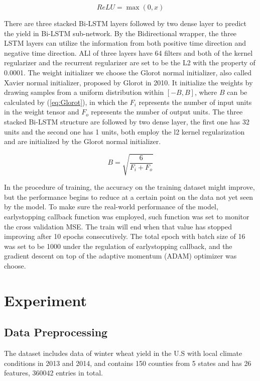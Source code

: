 \documentclass[conference, a4paper]{IEEEtran}
\begin{document}
      \begin{equation}
        ReLU=\max(0, x)
        \label{eq:relu}
      \end{equation}
      
      There are three stacked Bi-LSTM layers followed by two dense layer to predict the yield in Bi-LSTM sub-network. By the Bidirectional wrapper, the three LSTM layers can utilize the information from both positive time direction and negative time direction. ALl of three layers have 64 filters and both of the kernel regularizer and the recurrent regularizer are set to be the L2 with the property of 0.0001. The weight initializer we choose the Glorot normal initializer, also called Xavier normal initializer, proposed by Glorot in 2010\cite{glorotUnderstandingDifficultyTraining2010}. It initialize the weights by drawing samples from a uniform distribution within $[-B, B]$, where $B$ can be calculated by (\ref{eq:Glorot}), in which the $F_{i}$ represents the number of input units in the weight tensor and $F_o$ represents the number of output units. The three stacked Bi-LSTM structure are followed by two dense layer, the first one has 32 units and the second one has 1 units, both employ the l2 kernel regularization and are initialized by the Glorot normal initializer.
      
      \begin{equation}
        B = \sqrt{\frac{6}{F_{i} + F_{o}}}
        \label{eq:Glorot}
      \end{equation}

      In the procedure of training, the accuracy on the training dataset might improve, but the performance begins to reduce at a certain point on the data not yet seen by the model. To make sure the real-world performance of the model, earlystopping callback function was employed, such function was set to monitor the cross validation MSE. The train will end when that value has stopped improving after 10 epochs consecutively. The total epoch with batch size of 16 was set to be 1000 under the regulation of earlystopping callback, and the gradient descent on top of the adaptive momentum (ADAM) optimizer was choose.

\section{Experiment} \label{sec:ex}
  \subsection{Data Preprocessing} 
    The dataset includes data of winter wheat yield in the U.S with local climate conditions in 2013 and 2014, and contains 150 counties from 5 states and has 26 features, 360042 entries in total.
\end{document}

